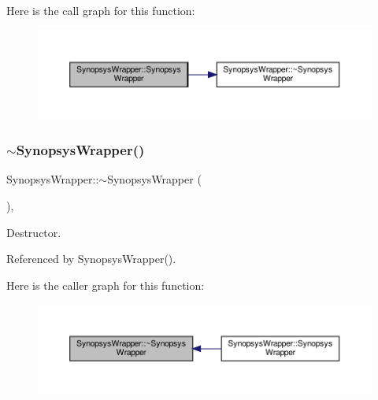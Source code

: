 Here is the call graph for this function\+:
\nopagebreak
\begin{figure}[H]
\begin{center}
\leavevmode
\includegraphics[width=350pt]{d7/d59/classSynopsysWrapper_a912d0f39b89cfb7d222fef79cf3d3e8a_cgraph}
\end{center}
\end{figure}
\mbox{\label{classSynopsysWrapper_a2c394e097d626783a67d9a8669e6646a}} 
\subsubsection{\texorpdfstring{$\sim$\+Synopsys\+Wrapper()}{~SynopsysWrapper()}}
{\footnotesize\ttfamily Synopsys\+Wrapper\+::$\sim$\+Synopsys\+Wrapper (\begin{DoxyParamCaption}{ }\end{DoxyParamCaption})\hspace{0.3cm}{\ttfamily [override]}, {\ttfamily [default]}}



Destructor. 



Referenced by Synopsys\+Wrapper().

Here is the caller graph for this function\+:
\nopagebreak
\begin{figure}[H]
\begin{center}
\leavevmode
\includegraphics[width=350pt]{d7/d59/classSynopsysWrapper_a2c394e097d626783a67d9a8669e6646a_icgraph}
\end{center}
\end{figure}


